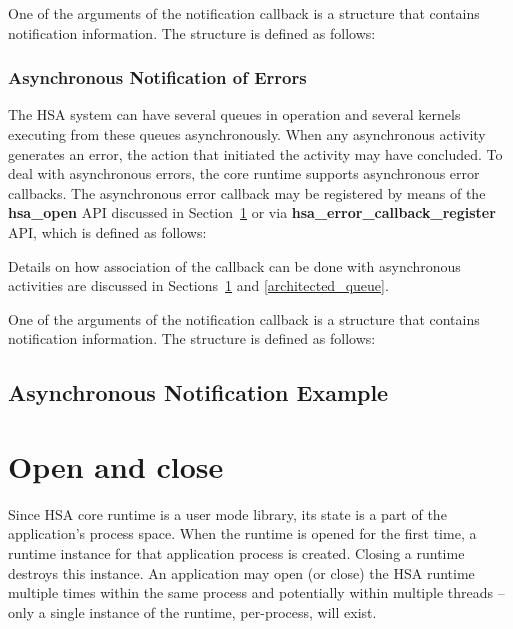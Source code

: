 \documentclass{book}
\newcommand{\reffun}[1]{\textbf{#1}}
\begin{document}


One of the arguments of the notification callback is a structure
that contains notification information. The structure is defined as
follows:



\subsubsection{Asynchronous Notification of Errors}\label{asynnotif}

The HSA system can have several queues in operation and
several kernels executing from these queues asynchronously.
When any asynchronous activity generates an error, the action that
initiated the activity may have concluded. To deal with
asynchronous errors, the core runtime supports asynchronous error
callbacks. The asynchronous error callback may be registered by means of the
\reffun{hsa\_open} API discussed in Section~\ref{init} or via
\reffun{hsa\_error\_callback\_register} API, which is defined as
follows:



Details on how association of the callback can be done with
asynchronous activities are discussed in Sections~\ref{init} and
\ref{architected_queue}.

One of the arguments of the notification callback is a structure
that contains notification information. The structure is defined as
follows:



\subsection{Asynchronous Notification Example}



\hypertarget{init}{}\section{Open and close}\label{init}

Since HSA core runtime is a user mode library, its state is a part
of the application's process space. When the runtime is opened for
the first time, a runtime instance for that application process is
created. Closing a runtime destroys this instance. An application
may open (or close) the HSA runtime multiple times within the same
process and potentially within multiple threads -- only a
single instance of the runtime, per-process, will exist.
\end{document}
